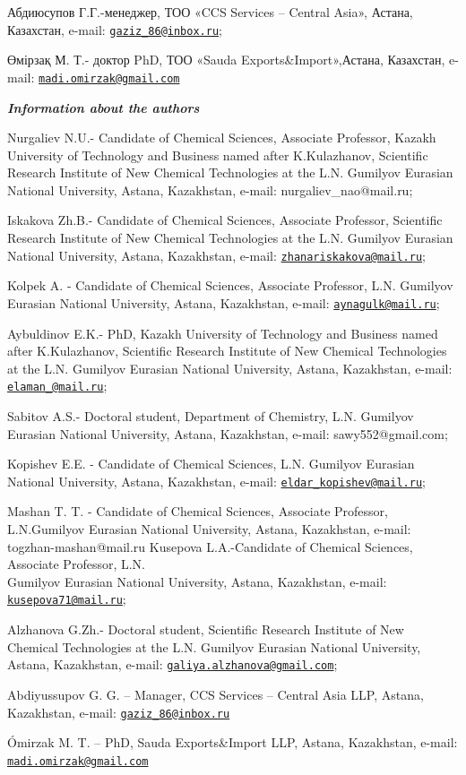 \begin{authorinfo}
Абдиюсупов Г.Г.-менеджер, ТОО «CCS Services -- Central Asia», Астана,
Казахстан, e-mail:
\href{mailto:gaziz_86@inbox.ru}{\nolinkurl{gaziz\_86@inbox.ru}};

Өмірзақ М. Т.- доктор PhD, ТОО «Sauda Exports\&Import»,Астана,
Казахстан, e-mail:
\href{mailto:madi.omirzak@gmail.com}{\nolinkurl{madi.omirzak@gmail.com}}

\emph{{\bfseries Information about the authors}}

Nurgaliev N.U.- Candidate of Chemical Sciences, Associate Professor,
Kazakh University of Technology and Business named after K.Kulazhanov,
Scientific Research Institute of New Chemical Technologies at the L.N.
Gumilyov Eurasian National University, Astana, Kazakhstan, e-mail:
nurgaliev\_nao@mail.ru;

Iskakova Zh.B.- Candidate of Chemical Sciences, Associate Professor,
Scientific Research Institute of New Chemical Technolo\-gies at the L.N.
Gumilyov Eurasian National University, Astana, Kazakhstan, e-mail:
\href{mailto:zhanariskakova@mail.ru}{\nolinkurl{zhanariskakova@mail.ru}};

Kolpek A. - Candidate of Chemical Sciences, Associate Professor, L.N.
Gumilyov Eurasian National University, Astana, Kazakhstan, e-mail:
\href{mailto:aynagulk@mail.ru}{\nolinkurl{aynagulk@mail.ru}};

Aybuldinov E.K.- PhD, Kazakh University of Technology and Business named
after K.Kulazhanov, Scientific Research Institute of New Chemical
Technologies at the L.N. Gumilyov Eurasian National University, Astana,
Kazakhstan, e-mail:\\
\href{mailto:elaman_@mail.ru}{\nolinkurl{elaman\_@mail.ru}};

Sabitov A.S.- Doctoral student, Department of Chemistry, L.N. Gumilyov
Eurasian National University, Astana, Kazakhstan, e-mail:
sawy552@gmail.com;

Kopishev E.E. - Candidate of Chemical Sciences, L.N. Gumilyov Eurasian
National University, Astana, Kazakhstan, e-mail:
\href{mailto:eldar_kopishev@mail.ru}{\nolinkurl{eldar\_kopishev@mail.ru}};

Mashan T. T. - Candidate of Chemical Sciences, Associate Professor,
L.N.Gumilyov Eurasian National University, Astana, Kazakhstan, e-mail:
togzhan-mashan@mail.ru Kusepova L.A.-Candidate of Chemical Sciences,
Associate Professor, L.N. \\Gumilyov Eurasian National University, Astana,
Kazakhstan, e-mail:
\href{mailto:kusepova71@mail.ru}{\nolinkurl{kusepova71@mail.ru}};

Alzhanova G.Zh.- Doctoral student, Scientific Research Institute of New
Chemical Technologies at the L.N. Gumilyov Eurasian National University,
Astana, Kazakhstan, e-mail:
\href{mailto:galiya.alzhanova@gmail.com}{\nolinkurl{galiya.alzhanova@gmail.com}};

Abdiyussupov G. G. -- Manager, CCS Services -- Central Asia LLP, Astana,
Kazakhstan, e-mail:
\href{mailto:gaziz_86@inbox.ru}{\nolinkurl{gaziz\_86@inbox.ru}}

Ómirzak M. T. -- PhD, Sauda Exports\&Import LLP, Astana, Kazakhstan,
e-mail:
\href{mailto:madi.omirzak@gmail.com}{\nolinkurl{madi.omirzak@gmail.com}}\
\end{authorinfo}
